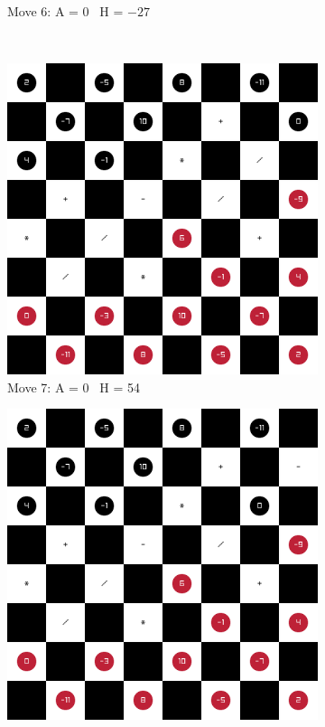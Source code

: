 \begin{figure}[H]
\begin{subfigure}{0.3\textwidth}
        \caption*{Move 6: A = 0 \textbar\ H = $-27$}
    \end{subfigure} \\
    \begin{subfigure}{0.3\textwidth}
        \centering
        \includegraphics[width=\textwidth]{images/games/game1/move_8.png}
        \caption*{Move 7: A = 0 \textbar\ H = 54}
    \end{subfigure}
    \quad
    \begin{subfigure}{0.3\textwidth}
        \centering
        \includegraphics[width=\textwidth]{images/games/game1/move_9.png}

\end{subfigure}
\end{figure}
